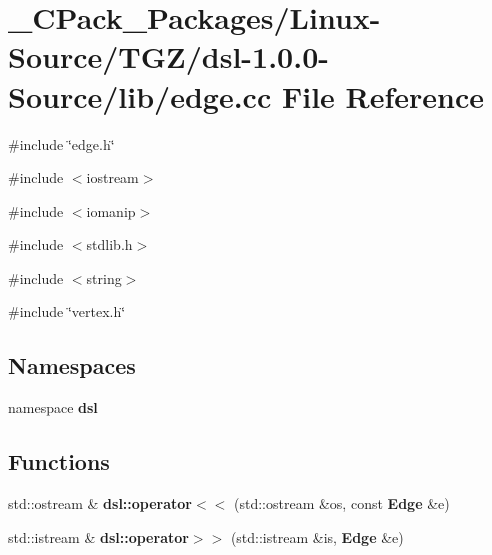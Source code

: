 \section{\_\-CPack\_\-Packages/Linux-\/Source/TGZ/dsl-\/1.0.0-\/Source/lib/edge.cc File Reference}
\label{__CPack__Packages_2Linux-Source_2TGZ_2dsl-1_80_80-Source_2lib_2edge_8cc}
{\ttfamily \#include \char`\"{}edge.h\char`\"{}}\par
{\ttfamily \#include $<$iostream$>$}\par
{\ttfamily \#include $<$iomanip$>$}\par
{\ttfamily \#include $<$stdlib.h$>$}\par
{\ttfamily \#include $<$string$>$}\par
{\ttfamily \#include \char`\"{}vertex.h\char`\"{}}\par
\subsection*{Namespaces}
\begin{DoxyCompactItemize}
\item 
namespace {\bf dsl}
\end{DoxyCompactItemize}
\subsection*{Functions}
\begin{DoxyCompactItemize}
\item 
std::ostream \& {\bf dsl::operator$<$$<$} (std::ostream \&os, const {\bf Edge} \&e)
\item 
std::istream \& {\bf dsl::operator$>$$>$} (std::istream \&is, {\bf Edge} \&e)
\end{DoxyCompactItemize}
